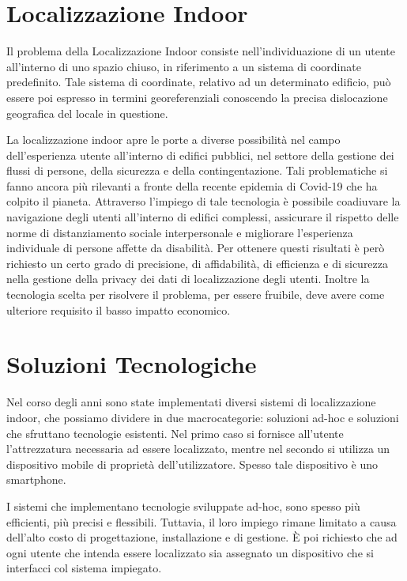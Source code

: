 \documentclass[draft]{standalone}
\begin{document}
\section{Localizzazione Indoor}
Il problema della Localizzazione Indoor consiste nell'individuazione di un
utente all'interno di uno spazio chiuso, in riferimento a un sistema di
coordinate predefinito. Tale sistema di coordinate, relativo ad un determinato
edificio, può essere poi espresso in termini georeferenziali conoscendo la
precisa dislocazione geografica del locale in questione. 

La localizzazione indoor apre le porte a diverse possibilità nel campo
dell'esperienza utente all'interno di edifici pubblici, nel settore della
gestione dei flussi di persone, della sicurezza e della contingentazione. Tali
problematiche si fanno ancora più rilevanti a fronte della recente epidemia di
Covid-19 che ha colpito il pianeta. Attraverso l'impiego di tale tecnologia è
possibile coadiuvare la navigazione degli utenti all'interno di edifici
complessi, assicurare il rispetto delle norme di distanziamento sociale
interpersonale e migliorare l'esperienza individuale di persone affette da
disabilità. Per ottenere questi risultati è però richiesto un certo grado di
precisione, di affidabilità, di efficienza e di sicurezza nella gestione della
privacy dei dati di localizzazione degli utenti. Inoltre la tecnologia scelta
per risolvere il problema, per essere fruibile, deve avere come ulteriore
requisito il basso impatto economico.

\section{Soluzioni Tecnologiche}
Nel corso degli anni sono state implementati diversi sistemi di localizzazione
indoor, che possiamo dividere in due macrocategorie: soluzioni ad-hoc e
soluzioni che sfruttano tecnologie esistenti. Nel primo caso si fornisce
all'utente l'attrezzatura necessaria ad essere localizzato, mentre nel secondo
si utilizza un dispositivo mobile di proprietà dell'utilizzatore.  Spesso tale
dispositivo è uno smartphone. 

I sistemi che implementano tecnologie sviluppate ad-hoc, sono spesso più
efficienti, più precisi e flessibili. Tuttavia, il loro impiego rimane limitato
a causa dell'alto costo di progettazione, installazione e di gestione. È poi
richiesto che ad ogni utente che intenda essere localizzato sia assegnato un
dispositivo che si interfacci col sistema impiegato.
\end{document}
